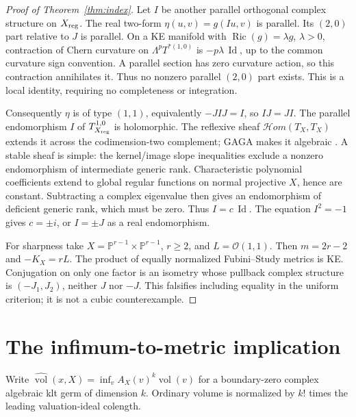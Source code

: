 \documentclass[11pt]{article}
\newcommand{\nv}{\widehat{\operatorname{vol}}}
\newcommand{\PP}{\mathbb P}
\begin{document}
\begin{proof}[Proof of Theorem~\ref{thm:index}]
Let $I$ be another parallel orthogonal complex structure on $X_{\rm reg}$.
The real two-form $\eta(u,v)=g(Iu,v)$ is parallel. Its $(2,0)$ part
relative to $J$ is parallel. On a KE manifold with
$\operatorname{Ric}(g)=\lambda g$, $\lambda>0$, contraction of Chern
curvature on $\Lambda^pT^{*(1,0)}$ is $-p\lambda\,\operatorname{Id}$,
up to the common curvature sign convention. A parallel section has zero
curvature action, so this contraction annihilates it. Thus no nonzero
parallel $(2,0)$ part exists. This is a local identity, requiring no
completeness or integration.

Consequently $\eta$ is of type $(1,1)$, equivalently
$-JIJ=I$, so $IJ=JI$. The parallel endomorphism $I$ of $T^{1,0}_{X_{\rm reg}}$
is holomorphic. The reflexive sheaf $\mathcal Hom(T_X,T_X)$ extends it
across the codimension-two complement; GAGA makes it algebraic
\cite[Theorem 2]{GAGA}.
A stable sheaf is simple: the kernel/image slope inequalities exclude
a nonzero endomorphism of intermediate generic rank. Characteristic
polynomial coefficients extend to global regular functions on normal
projective $X$, hence are constant. Subtracting a complex eigenvalue
then gives an endomorphism of deficient generic rank, which must be zero.
Thus $I=c\,\operatorname{Id}$. The equation $I^2=-1$ gives
$c=\pm i$, or $I=\pm J$ as a real endomorphism.

For sharpness take $X=\PP^{r-1}\times\PP^{r-1}$, $r\geq2$, and
$L=\mathcal O(1,1)$. Then $m=2r-2$ and $-K_X=rL$. The product of equally
normalized Fubini--Study metrics is KE. Conjugation on only one factor
is an isometry whose pullback complex structure is $(-J_1,J_2)$,
neither $J$ nor $-J$. This falsifies including equality in the uniform
criterion; it is not a cubic counterexample.
\end{proof}

\section{The infimum-to-metric implication}
Write $\nv(x,X)=\inf_v A_X(v)^k\operatorname{vol}(v)$ for a
boundary-zero complex algebraic klt germ of dimension $k$. Ordinary volume
is normalized by $k!$ times the leading valuation-ideal colength.
\end{document}
